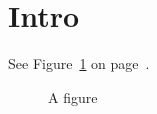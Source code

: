\documentclass{article}
\begin{document}
\section{Intro}\label{sec:intro}
See Figure~\ref{fig:fig} on page~\pageref{fig:fig}. \myDocMacro
\begin{figure}[h]
\centering
\begin{sporkfigure}

\end{sporkfigure}
\caption{A figure}\label{fig:fig}
\end{figure}
\end{document}
